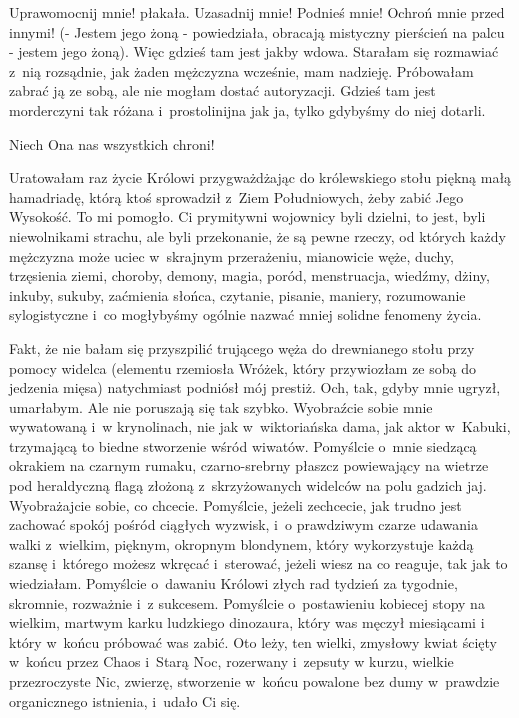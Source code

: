 \documentclass[oneside,polish,12pt,sfheadings]{mwbk}
\begin{document}
Uprawomocnij mnie! płakała. Uzasadnij mnie! Podnieś mnie! Ochroń mnie
przed innymi! (- Jestem jego żoną - powiedziała, obracają mistyczny
pierścień na palcu - jestem jego żoną). Więc gdzieś tam jest jakby
wdowa. Starałam się rozmawiać z~nią rozsądnie, jak żaden mężczyzna
wcześnie, mam nadzieję. Próbowałam zabrać ją ze sobą, ale nie mogłam
dostać autoryzacji. Gdzieś tam jest morderczyni tak różana i~prostolinijna
jak ja, tylko gdybyśmy do niej dotarli.

Niech Ona nas wszystkich chroni!

Uratowałam raz życie Królowi przygważdżając do królewskiego stołu
piękną małą hamadriadę, którą ktoś sprowadził z~Ziem Południowych,
żeby zabić Jego Wysokość. To mi pomogło. Ci prymitywni wojownicy byli
dzielni, to jest, byli niewolnikami strachu, ale byli przekonanie,
że są pewne rzeczy, od których każdy mężczyzna może uciec w~skrajnym
przerażeniu, mianowicie węże, duchy, trzęsienia ziemi, choroby, demony,
magia, poród, menstruacja, wiedźmy, dżiny, inkuby, sukuby, zaćmienia
słońca, czytanie, pisanie, maniery, rozumowanie sylogistyczne i~co
mogłybyśmy ogólnie nazwać mniej solidne fenomeny życia.

Fakt, że nie bałam się przyszpilić trującego węża do drewnianego stołu
przy pomocy widelca (elementu rzemiosła Wróżek, który przywiozłam
ze sobą do jedzenia mięsa) natychmiast podniósł mój prestiż. Och,
tak, gdyby mnie ugryzł, umarłabym. Ale nie poruszają się tak szybko.
Wyobraźcie sobie mnie wywatowaną i~w krynolinach, nie jak w~wiktoriańska
dama, jak aktor w~Kabuki, trzymającą to biedne stworzenie wśród wiwatów.
Pomyślcie o~mnie siedzącą okrakiem na czarnym rumaku, czarno-srebrny
płaszcz powiewający na wietrze pod heraldyczną flagą złożoną z~skrzyżowanych
widelców na polu gadzich jaj. Wyobrażajcie sobie, co chcecie. Pomyślcie,
jeżeli zechcecie, jak trudno jest zachować spokój pośród ciągłych
wyzwisk, i~o prawdziwym czarze udawania walki z~wielkim, pięknym,
okropnym blondynem, który wykorzystuje każdą szansę i~którego możesz
wkręcać i~sterować, jeżeli wiesz na co reaguje, tak jak to wiedziałam.
Pomyślcie o~dawaniu Królowi złych rad tydzień za tygodnie, skromnie,
rozważnie i~z sukcesem. Pomyślcie o~postawieniu kobiecej stopy na
wielkim, martwym karku ludzkiego dinozaura, który was męczył miesiącami
i który w~końcu próbować was zabić. Oto leży, ten wielki, zmysłowy
kwiat ścięty w~końcu przez Chaos i~Starą Noc, rozerwany i~zepsuty
w kurzu, wielkie przezroczyste Nic, zwierzę, stworzenie w~końcu powalone
bez dumy w~prawdzie organicznego istnienia, i~udało Ci się.
\end{document}
